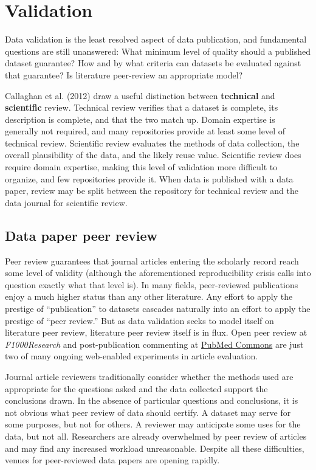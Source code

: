 \documentclass[10pt,a4paper,twocolumn]{article}
\begin{document}
{\section*{Validation}\label{validation}

Data validation is the least resolved aspect of data publication, and fundamental questions are still unanswered:
What minimum level of quality should a published dataset guarantee?
How and by what criteria can datasets be evaluated against that guarantee?
Is literature peer-review an appropriate model?

Callaghan et al. (2012)\cite{sarah_callaghan_making_2012} draw a useful distinction between \textbf{technical} and \textbf{scientific} review.
Technical review verifies that a dataset is complete, its description is complete, and that the two match up.
Domain expertise is generally not required, and many repositories provide at least some level of technical review.
Scientific review evaluates the methods of data collection, the overall plausibility of the data, and the likely reuse value.
Scientific review does require domain expertise, making this level of validation more difficult to organize, and few repositories provide it.
When data is published with a data paper, review may be split between the repository for technical review and the data journal for scientific review.

\subsection*{Data paper peer review}\label{data-paper-peer-review}

Peer review guarantees that journal articles entering the scholarly record reach some level of validity (although the aforementioned reproducibility crisis calls into question exactly what that level is).
In many fields, peer-reviewed publications enjoy a much higher status than any other literature.
Any effort to apply the prestige of ``publication'' to datasets cascades naturally into an effort to apply the prestige of ``peer review.''
But as data validation seeks to model itself on literature peer review, literature peer review itself is in flux\cite{pulverer_transparent_2010, herron_is_2012, kriegeskorte_emerging_2012}.
Open peer review at \emph{F1000Research} and post-publication commenting at \href{http://www.ncbi.nlm.nih.gov/pubmedcommons/}{PubMed Commons} are just two of many ongoing web-enabled experiments in article evaluation.

Journal article reviewers traditionally consider whether the methods used are appropriate for the questions asked and the data collected support the conclusions drawn.
In the absence of particular questions and conclusions, it is not obvious what peer review of data should certify.
A dataset may serve for some purposes, but not for others\cite{parsons_data_2010}.
A reviewer may anticipate some uses for the data, but not all.
Researchers are already overwhelmed by peer review of articles\cite{diederich_are_2013} and may find any increased workload unreasonable.
Despite all these difficulties, venues for peer-reviewed data papers are opening rapidly.

}
\end{document}
